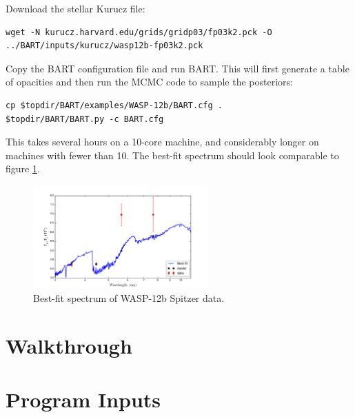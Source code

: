 \documentclass[letterpaper, 12pt]{article}
\begin{document}
\noindent Download the stellar Kurucz file:
{\fontsize{9.8}{1em}\selectfont
\begin{verbatim}
wget -N kurucz.harvard.edu/grids/gridp03/fp03k2.pck -O ../BART/inputs/kurucz/wasp12b-fp03k2.pck
\end{verbatim}}
\noindent Copy the BART configuration file and run BART. This will
first generate a table of opacities and then run the MCMC code to
sample the posteriors:

{\fontsize{9.8}{1em}\selectfont
\begin{verbatim}
cp $topdir/BART/examples/WASP-12b/BART.cfg .
$topdir/BART/BART.py -c BART.cfg
\end{verbatim}}

\noindent This takes several hours on a 10-core machine, and
considerably longer on machines with fewer than 10. The best-fit
spectrum should look comparable to figure \ref{fig:wasp12}.

\begin{figure}[htb]
\centerline{
\includegraphics[width=0.6\textwidth, clip]{figs/WASP-12b-Spectrum}}
\caption{\small \label{fig:wasp12} Best-fit spectrum of WASP-12b Spitzer data.}
\end{figure}

\section{Walkthrough}
\label{sec:walk}



\section{Program Inputs}
\label{sec:inputs}
\end{document}
